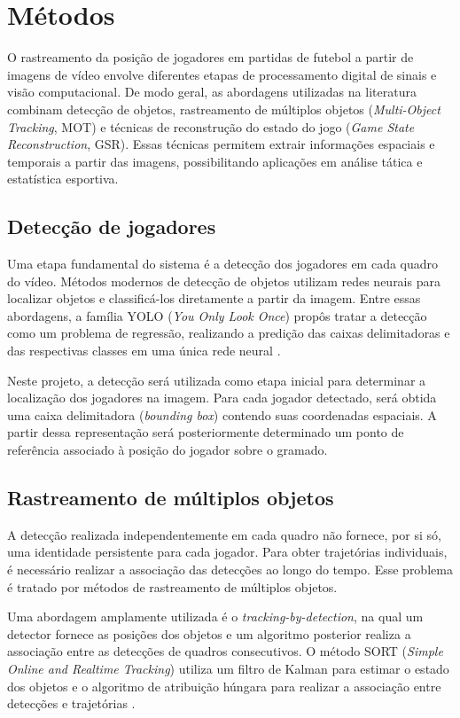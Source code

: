 \section{Métodos}

O rastreamento da posição de jogadores em partidas de futebol a partir de imagens de vídeo envolve diferentes etapas de processamento digital de sinais e visão computacional. De modo geral, as abordagens utilizadas na literatura combinam detecção de objetos, rastreamento de múltiplos objetos (\textit{Multi-Object Tracking}, MOT) e técnicas de reconstrução do estado do jogo (\textit{Game State Reconstruction}, GSR). Essas técnicas permitem extrair informações espaciais e temporais a partir das imagens, possibilitando aplicações em análise tática e estatística esportiva.

\subsection{Detecção de jogadores}

Uma etapa fundamental do sistema é a detecção dos jogadores em cada quadro do vídeo. Métodos modernos de detecção de objetos utilizam redes neurais para localizar objetos e classificá-los diretamente a partir da imagem. Entre essas abordagens, a família YOLO (\textit{You Only Look Once}) propôs tratar a detecção como um problema de regressão, realizando a predição das caixas delimitadoras e das respectivas classes em uma única rede neural \cite{redmon2016yolo}.

Neste projeto, a detecção será utilizada como etapa inicial para determinar a localização dos jogadores na imagem. Para cada jogador detectado, será obtida uma caixa delimitadora (\textit{bounding box}) contendo suas coordenadas espaciais. A partir dessa representação será posteriormente determinado um ponto de referência associado à posição do jogador sobre o gramado.

\subsection{Rastreamento de múltiplos objetos}

A detecção realizada independentemente em cada quadro não fornece, por si só, uma identidade persistente para cada jogador. Para obter trajetórias individuais, é necessário realizar a associação das detecções ao longo do tempo. Esse problema é tratado por métodos de rastreamento de múltiplos objetos.

Uma abordagem amplamente utilizada é o \textit{tracking-by-detection}, na qual um detector fornece as posições dos objetos e um algoritmo posterior realiza a associação entre as detecções de quadros consecutivos. O método SORT (\textit{Simple Online and Realtime Tracking}) utiliza um filtro de Kalman para estimar o estado dos objetos e o algoritmo de atribuição húngara para realizar a associação entre detecções e trajetórias \cite{bewley2016sort}.

